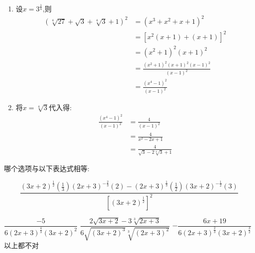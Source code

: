 \documentclass[answers]{exam}
\begin{document}
\begin{questions}
	\begin{solution}
		\begin{enumerate}
			\item 设$\displaystyle x=3^{\frac{1}{4}}$,则
			      \begin{align*}
				      (\sqrt[4]{27} + \sqrt{3} + \sqrt[4]{3} + 1)^2 & = (x^3 + x^2 + x + 1)^2                     \\
				                                                    & = [x^2(x+1) + (x+1)]^2                      \\
				                                                    & = (x^2 + 1)^2(x+1)^2                        \\
				                                                    & = \frac{(x^2 + 1)^2(x+1)^2(x-1)^2}{(x-1)^2} \\
				                                                    & = \frac{(x^4 - 1)^2}{(x-1)^2}
			      \end{align*}
			\item 将$x=\sqrt[4]{3}$代入得:
			      \begin{align*}
				      \frac{(x^4 - 1)^2}{(x-1)^2} & = \frac{4}{(x-1)^2}                     \\
				                                  & = \frac{4}{x^2 - 2x + 1}                \\
				                                  & = \frac{4}{\sqrt{3} - 2\sqrt[4]{3} + 1}
			      \end{align*}
		\end{enumerate}
	\end{solution}

	\question 哪个选项与以下表达式相等:

	\begin{equation*}
		\dfrac{(3x+2)^{\frac{1}{2}}\left(\frac{1}{3}\right)(2x+3)^{-\frac{2}{3}}(2) -
		(2x+3)^{\frac{1}{3}}\left(\frac{1}{2}\right)(3x+2)^{-\frac{1}{2}}(3)}{\left[(3x+2)^\frac{1}{2}\right]^2}
	\end{equation*}

	\begin{oneparchoices}
		\choice \(  \dfrac{-5}{6(2x+3)^{\frac{4}{3}}(3x+2)^2}\)
		\choice \( \dfrac{2\sqrt{3x+2} - 3\sqrt[3]{2x+3}}{6\sqrt{(3x+2)^3}\sqrt[3]{(2x+3)^2}} \)
		\CorrectChoice \( -\dfrac{6x+19}{6(2x+3)^{\frac{2}{3}}(3x+2)^{\frac{3}{2}}} \) \\
		\choice 以上都不对
	\end{oneparchoices}


\end{questions}
\end{document}
